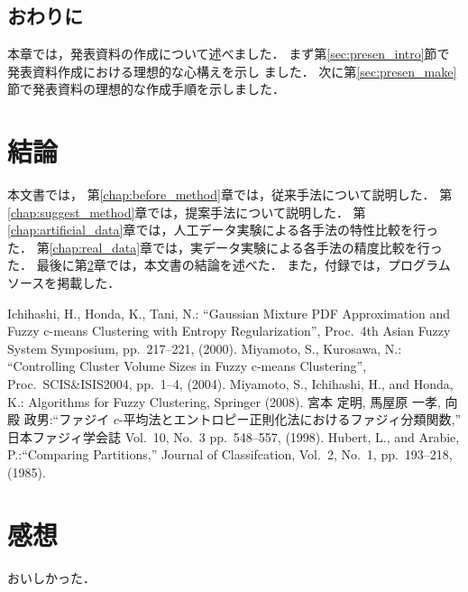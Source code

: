 \documentclass[a4j,12pt,dvipdfmx,oneside]{jsbook}
\theoremstyle{definition}
\begin{document}
\section{おわりに}\label{sec:real_data_summary}
本章では，発表資料の作成について述べました．
まず第\ref{sec:presen_intro}節で発表資料作成における理想的な心構えを示し
ました．
次に第\ref{sec:presen_make}節で発表資料の理想的な作成手順を示しました．
%
%
%
%
\chapter{結論}\label{chap:conclusion}
本文書では，
第\ref{chap:before_method}章では，従来手法について説明した．
第\ref{chap:suggest_method}章では，提案手法について説明した．
第\ref{chap:artificial_data}章では，人工データ実験による各手法の特性比較を行った．
第\ref{chap:real_data}章では，実データ実験による各手法の精度比較を行った．
最後に第\ref{chap:conclusion}章では，本文書の結論を述べた．
また，付録では，プログラムソースを掲載した．
%
%
%
%
%
%
\begin{thebibliography}{5}
Ichihashi, H., Honda, K., Tani, N.: ``Gaussian Mixture PDF Approximation and Fuzzy c-means Clustering with Entropy Regularization'', Proc.~4th Asian Fuzzy System Symposium, pp.~217--221, (2000).
Miyamoto, S., Kurosawa, N.: ``Controlling Cluster Volume Sizes in Fuzzy c-means Clustering'', Proc.~SCIS\&ISIS2004, pp.~1--4, (2004).
Miyamoto, S., Ichihashi, H., and Honda, K.: Algorithms for Fuzzy Clustering, Springer (2008).
宮本 定明, 馬屋原 一孝, 向殿 政男:``ファジイ $c$-平均法とエントロピー正則化法におけるファジィ分類関数,''  日本ファジィ学会誌 Vol.~10, No.~3  pp.~548--557, (1998).
 Hubert, L., and Arabie, P.:``Comparing Partitions,'' Journal of Classifcation, Vol.~2, No.~1,
pp.~193--218, (1985).
\end{thebibliography}
%
\chapter*{感想}
\label{chap:feel}
おいしかった．
\end{document}
